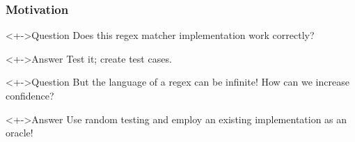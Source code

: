 \documentclass[pdftex,aspectratio=169]{beamer}
\begin{document}
\begin{frame}
  \frametitle{Motivation}
  \begin{block}<+->{Question}
    Does this regex matcher implementation work correctly?
  \end{block}
  \begin{exampleblock}<+->{Answer}
    Test it; create test cases.
  \end{exampleblock}
  \begin{block}<+->{Question}
    But the language of a regex can be infinite! How can we increase confidence?
  \end{block}
  \begin{exampleblock}<+->{Answer}
    Use random testing and employ an existing implementation as an oracle!
  \end{exampleblock}
\end{frame}
\end{document}
